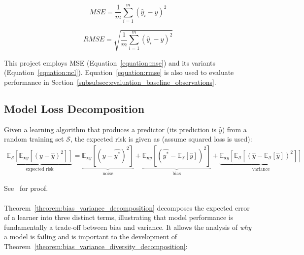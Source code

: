 \begin{equation}
    \label{equation:mse}
    MSE = \frac{1}{m} \sum_{i=1}^{m} (\hat{y}_i - y)^{2}
\end{equation}

\begin{equation}
    \label{equation:rmse}
    RMSE = \sqrt{\frac{1}{m} \sum_{i=1}^{m} (\hat{y}_i - y)^{2}}
\end{equation}

This project employs MSE (Equation~\ref{equation:mse}) and its variants (Equation~\ref{equation:ncl}). Equation~\ref{equation:rmse} is also used to evaluate performance in Section~\ref{subsubsec:evaluation_baseline_observations}. 


\subsection{Model Loss Decomposition}
\label{subsec:background_model_loss_decomposition}
\begin{theorem}\label{theorem:bias_variance_decomposition}
    Given a learning algorithm that produces a predictor (its prediction is $\hat{y}$) from a random training set $\mathcal{S}$, the expected risk is given as (assume squared loss is used): 
    \begin{align*}
        \underbrace{\mathbb{E}_{\mathcal{S}}\left[\mathbb{E}_{\mathbf{x}y}\left[(y - \hat{y})^2\right]\right]}_{\text{expected risk}} = \underbrace{\mathbb{E}_{\mathbf{x}y}\left[(y - \hat{y^*})^2\right]}_{\text{noise}} + \underbrace{\mathbb{E}_{\mathbf{x}y}\left[\left(\hat{y^*} - \mathbb{E}_{\mathcal{S}}[\hat{y}]\right)^2\right]}_{\text{bias}} + \underbrace{\mathbb{E}_{\mathbf{x}y}\left[\mathbb{E}_{\mathcal{S}}\left[(\hat{y} - \mathbb{E}_{\mathcal{S}}[\hat{y}])^2\right]\right]}_{\text{variance}}
    \end{align*}
\end{theorem}
See~\cite{geman1992neural} for proof. 
\\
\\
Theorem~\ref{theorem:bias_variance_decomposition} decomposes the expected error of a learner into three distinct terms, illustrating that model performance is fundamentally a trade-off between bias and variance. It allows the analysis of \textit{why} a model is failing and is important to the development of Theorem~\ref{theorem:bias_variance_diversity_decomposition}: 
